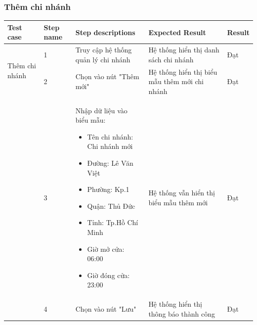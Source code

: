 \subsubsection{Thêm chi nhánh}
{
    \setlength\extrarowheight{6pt}
    \begin{longtable}{| p{2.5cm}| p{1cm}| p{5.5cm}| p{4.5cm} | p{1.5cm} |}
        \hline
        \textbf{Test case}                         & \textbf{Step name}                             & \textbf{Step descriptions}          & \textbf{Expected Result}                      & \textbf{Result} \\
        \hline
        \multirow[t]{2}{2.5cm}{Thêm chi nhánh}     & 1                                              & Truy cập hệ thống quản lý chi nhánh & Hệ thống hiển thị danh sách chi nhánh         & Đạt             \\
        \cline{2-5}
                                                   & 2                                              & Chọn vào nút "Thêm mới"             & Hệ thống hiển thị biểu mẫu thêm mới chi nhánh & Đạt             \\
        \cline{2-5}
                                                   & 3                                              & Nhập dữ liệu vào biểu mẫu:
        \begin{itemize}
            \item Tên chi nhánh: Chi nhánh mới
            \item Đường: Lê Văn Việt
            \item Phường: Kp.1
            \item Quận: Thủ Đức
            \item Tỉnh: Tp.Hồ Chí Minh
            \item Giờ mở cửa: 06:00
            \item Giờ đóng cửa: 23:00
        \end{itemize}         & Hệ thống vẫn hiển thị biểu mẫu thêm mới        & Đạt                                                                                                                        \\
        \cline{2-5}
                                                   & 4                                              & Chọn vào nút "Lưu"                  & Hệ thống hiển thị thông báo thành công        & Đạt             \\
        \hline

\end{longtable}}

